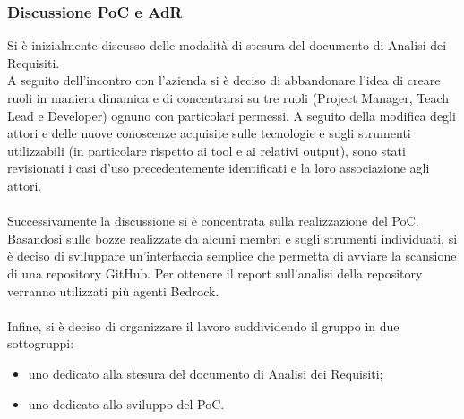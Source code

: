\documentclass[a4paper, 11pt]{article}
\begin{document}
\subsubsection{Discussione PoC e AdR}
Si è inizialmente discusso delle modalità di stesura del documento di Analisi dei Requisiti.\\
A seguito dell'incontro con l'azienda si è deciso di abbandonare l'idea di creare ruoli in maniera dinamica e di concentrarsi su tre ruoli (Project Manager, Teach Lead e Developer) ognuno con particolari permessi.
A seguito della modifica degli attori e delle nuove conoscenze acquisite sulle tecnologie e sugli strumenti utilizzabili (in particolare rispetto ai tool e ai relativi output), sono stati revisionati i casi d'uso precedentemente identificati e la loro associazione agli attori.\\
\\
Successivamente la discussione si è concentrata sulla realizzazione del PoC. Basandosi sulle bozze realizzate da alcuni membri e sugli strumenti individuati, si è deciso di sviluppare un'interfaccia semplice che permetta di avviare la scansione di una repository GitHub. Per ottenere il report sull'analisi della repository verranno utilizzati più agenti Bedrock.\\
\\
Infine, si è deciso di organizzare il lavoro suddividendo il gruppo in due sottogruppi:
\begin{itemize}
    \item uno dedicato alla stesura del documento di Analisi dei Requisiti;
    \item uno dedicato allo sviluppo del PoC.
\end{itemize}
\end{document}
